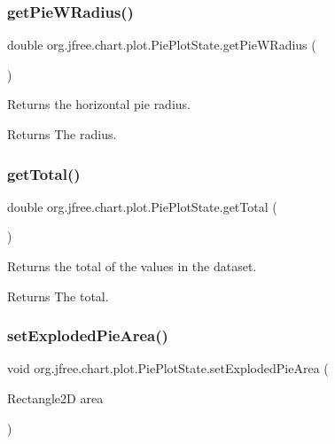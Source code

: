 \subsubsection{\texorpdfstring{get\+Pie\+W\+Radius()}{getPieWRadius()}}
{\footnotesize\ttfamily double org.\+jfree.\+chart.\+plot.\+Pie\+Plot\+State.\+get\+Pie\+W\+Radius (\begin{DoxyParamCaption}{ }\end{DoxyParamCaption})}

Returns the horizontal pie radius.

\begin{DoxyReturn}{Returns}
The radius. 
\end{DoxyReturn}
\mbox{\label{classorg_1_1jfree_1_1chart_1_1plot_1_1_pie_plot_state_adfd904fd80acd6ee192f738f712b5ffa}} 
\subsubsection{\texorpdfstring{get\+Total()}{getTotal()}}
{\footnotesize\ttfamily double org.\+jfree.\+chart.\+plot.\+Pie\+Plot\+State.\+get\+Total (\begin{DoxyParamCaption}{ }\end{DoxyParamCaption})}

Returns the total of the values in the dataset.

\begin{DoxyReturn}{Returns}
The total. 
\end{DoxyReturn}
\mbox{\label{classorg_1_1jfree_1_1chart_1_1plot_1_1_pie_plot_state_a831a22430ac5eedaac8da92c19b1c996}} 
\subsubsection{\texorpdfstring{set\+Exploded\+Pie\+Area()}{setExplodedPieArea()}}
{\footnotesize\ttfamily void org.\+jfree.\+chart.\+plot.\+Pie\+Plot\+State.\+set\+Exploded\+Pie\+Area (\begin{DoxyParamCaption}\item[{Rectangle2D}]{area }\end{DoxyParamCaption})}

